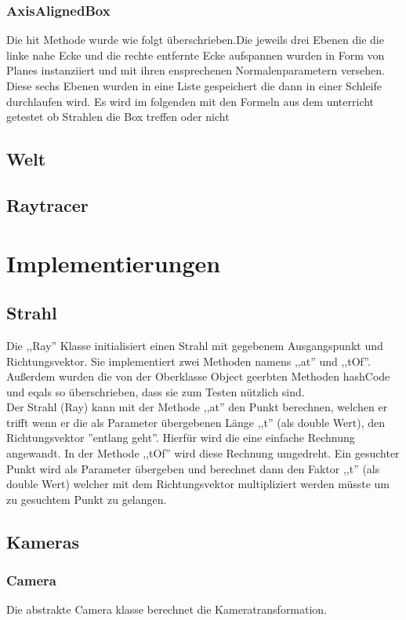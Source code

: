 \documentclass[14pt]{extarticle}
\begin{document}
\subsubsection{AxisAlignedBox}
Die hit Methode wurde wie folgt überschrieben.Die jeweils drei Ebenen die die linke nahe Ecke und die rechte entfernte Ecke aufspannen wurden in Form von Planes instanziiert und mit ihren ensprechenen Normalenparametern versehen. Diese sechs Ebenen wurden in eine Liste gespeichert die dann in einer Schleife durchlaufen wird. Es wird im folgenden mit den Formeln aus dem unterricht getestet ob Strahlen die Box treffen oder nicht

\subsection{Welt}

\subsection{Raytracer}
\section{Implementierungen}

\subsection{Strahl}
Die ,,Ray'' Klasse initialisiert einen Strahl mit gegebenem Ausgangspunkt und Richtungsvektor. Sie implementiert zwei Methoden namens ,,at'' und ,,tOf''. Außerdem wurden die von der Oberklasse Object geerbten Methoden hashCode und eqals so überschrieben, dass sie zum Testen nützlich sind.\\
Der Strahl (Ray) kann mit der Methode ,,at'' den Punkt berechnen, welchen er trifft wenn er die als Parameter übergebenen Länge ,,t'' (als double Wert), den Richtungsvektor ''entlang geht''. Hierfür wird die eine einfache Rechnung angewandt. 
In der Methode ,,tOf'' wird diese Rechnung umgedreht. Ein gesuchter Punkt wird als Parameter übergeben und berechnet dann den Faktor ,,t'' (als double Wert) welcher mit dem Richtungsvektor multipliziert werden müsste um zu gesuchtem Punkt zu gelangen. \\
\subsection{Kameras}
\subsubsection{Camera}
Die abstrakte Camera klasse berechnet die Kameratransformation.
\end{document}
